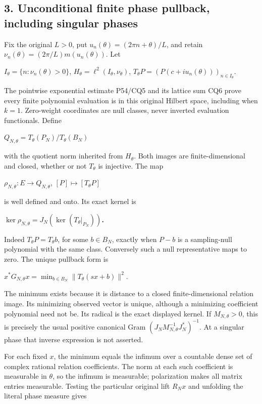 \subsection{3. Unconditional finite phase pullback, including singular phases}\label{unconditional-finite-phase-pullback-including-singular-phases}

Fix the original \(L>0\), put \(u_n(\theta)=(2\pi n+\theta)/L\), and retain \(\nu_n(\theta)=(2\pi/L)m(u_n(\theta))\). Let

\(I_\theta=\{n:\nu_n(\theta)>0\}\), \(H_\theta=\ell^2(I_\theta,\nu_\theta)\), \(T_\theta P=(P(c+iu_n(\theta)))_{n\in I_\theta}\).

The pointwise exponential estimate P54/CQ5 and its lattice sum CQ6 prove every finite polynomial evaluation is in this original Hilbert space, including when \(k=1\). Zero-weight coordinates are null classes, never inverted evaluation functionals. Define

\(Q_{N,\theta}=T_\theta(P_N)/T_\theta(B_N)\)

with the quotient norm inherited from \(H_\theta\). Both images are finite-dimensional and closed, whether or not \(T_\theta\) is injective. The map

\(\rho_{N,\theta}:E\longrightarrow Q_{N,\theta}\), \([P]\longmapsto[T_\theta P]\)

is well defined and onto. Its exact kernel is

\textbf{\(\ker\rho_{N,\theta}=J_N(\ker(T_\theta|_{P_N}))\).}

Indeed \(T_\theta P=T_\theta b\), for some \(b\in B_N\), exactly when \(P-b\) is a sampling-null polynomial with the same class. Conversely such a null representative maps to zero. The unique pullback form is

\(x^*G_{N,\theta}x=\min_{b\in B_N}\|T_\theta(sx+b)\|^2\).

The minimum exists because it is distance to a closed finite-dimensional relation image. Its minimizing observed vector is unique, although a minimizing coefficient polynomial need not be. Its radical is the exact displayed kernel. If \(M_{N,\theta}>0\), this is precisely the usual positive canonical Gram \((J_NM_{N,\theta}^{-1}J_N^*)^{-1}\). At a singular phase that inverse expression is not asserted.

For each fixed \(x\), the minimum equals the infimum over a countable dense set of complex rational relation coefficients. The norm at each such coefficient is measurable in \(\theta\), so the infimum is measurable; polarization makes all matrix entries measurable. Testing the particular original lift \(R_Nx\) and unfolding the literal phase measure gives

